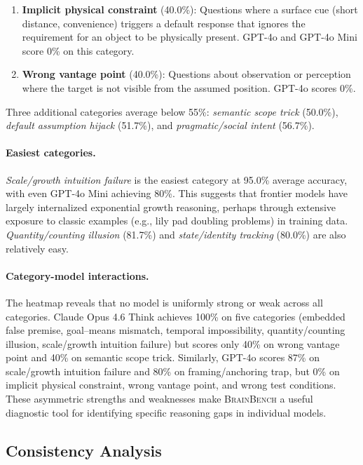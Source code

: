 \documentclass[11pt]{article}
\newcommand{\bench}{\textsc{BrainBench}}
\begin{document}
\begin{enumerate}[leftmargin=*, itemsep=2pt]
  \item \textbf{Implicit physical constraint} (40.0\%): Questions where a surface cue (short distance, convenience) triggers a default response that ignores the requirement for an object to be physically present. GPT-4o and GPT-4o Mini score 0\% on this category.
  \item \textbf{Wrong vantage point} (40.0\%): Questions about observation or perception where the target is not visible from the assumed position. GPT-4o scores 0\%.
\end{enumerate}

Three additional categories average below 55\%: \emph{semantic scope trick} (50.0\%), \emph{default assumption hijack} (51.7\%), and \emph{pragmatic/social intent} (56.7\%).

\paragraph{Easiest categories.}
\emph{Scale/growth intuition failure} is the easiest category at 95.0\% average accuracy, with even GPT-4o Mini achieving 80\%. This suggests that frontier models have largely internalized exponential growth reasoning, perhaps through extensive exposure to classic examples (e.g., lily pad doubling problems) in training data. \emph{Quantity/counting illusion} (81.7\%) and \emph{state/identity tracking} (80.0\%) are also relatively easy.

\paragraph{Category-model interactions.}
The heatmap reveals that no model is uniformly strong or weak across all categories. Claude Opus 4.6 Think achieves 100\% on five categories (embedded false premise, goal--means mismatch, temporal impossibility, quantity/counting illusion, scale/growth intuition failure) but scores only 40\% on wrong vantage point and 40\% on semantic scope trick. Similarly, GPT-4o scores 87\% on scale/growth intuition failure and 80\% on framing/anchoring trap, but 0\% on implicit physical constraint, wrong vantage point, and wrong test conditions. These asymmetric strengths and weaknesses make \bench{} a useful diagnostic tool for identifying specific reasoning gaps in individual models.

\subsection{Consistency Analysis}
\end{document}
